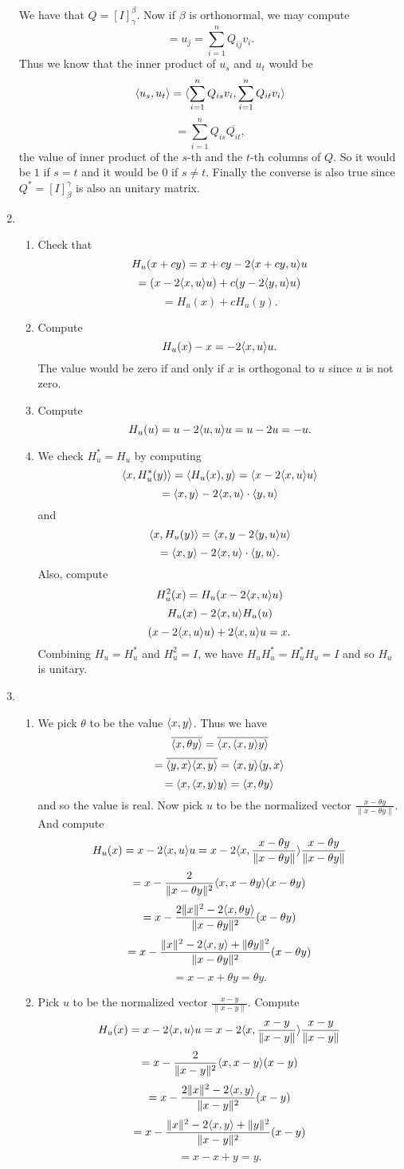 \begin{enumerate}
We have that $Q=[I]_{\gamma}^{\beta}$. Now if $\beta $ is orthonormal, we may compute 
\[=u_j=\sum_{i=1}^n{Q_{ij}v_i}.\]
Thus we know that the inner product of $u_s$ and $u_t$ would be 
\[\langle u_s,u_t\rangle =\langle \sum_{i=1}^n{Q_{is}v_i},\sum_{i=1}^n{Q_{it}v_i}\rangle \]
\[=\sum_{i=1}^n{Q_{is}\overline{Q_{it}}},\]
the value of inner product of the $s$-th and the $t$-th columns of $Q$. So it would be $1$ if $s=t$ and it would be $0$ if $s\neq t$. Finally the converse is also true since $Q^*=[I]_{\beta}^{\gamma}$ is also an unitary matrix.
\item \begin{enumerate}
\item Check that 
\[H_u(x+cy)=x+cy-2\langle x+cy,u\rangle u\]
\[=(x-2\langle x,u\rangle u)+c(y-2\langle y,u\rangle u)\]
\[=H_u(x)+cH_u(y).\]
\item Compute 
\[H_u(x)-x=-2\langle x,u\rangle u .\]
The value would be zero if and only if $x$ is orthogonal to $u$ since $u$ is not zero.
\item Compute 
\[H_u(u)=u-2\langle u,u\rangle u=u-2u=-u.\]
\item We check $H_u^*=H_u$ by computing 
\[\langle x,H_u^*(y)\rangle =\langle H_u(x),y\rangle =\langle x-2\langle x,u\rangle u\rangle \]
\[=\langle x,y\rangle -2\langle x,u\rangle \cdot \langle y,u\rangle \]
and 
\[\langle x,H_u(y)\rangle =\langle x,y-2\langle y,u\rangle u\rangle\]
\[=\langle x,y\rangle -2\langle x,u\rangle \cdot \langle y,u\rangle .\]
Also, compute
\[H_u^2(x)=H_u(x-2\langle x,u\rangle u)\]
\[H_u(x)-2\langle x,u\rangle H_u(u)\]
\[(x-2\langle x,u\rangle u)+2\langle x,u\rangle u=x.\]
Combining $H_u=H_u^*$ and $H_u^2=I$, we have $H_uH_u^*=H_u^*H_u=I$ and so $H_u$ is unitary.
\end{enumerate}
\item \begin{enumerate}
\item We pick $\theta $ to be the value $\langle x,y\rangle$. Thus we have 
\[\overline{\langle x,\theta y\rangle }=\overline{\langle x,\langle x,y\rangle y\rangle }\]
\[=\overline{\langle y,x\rangle\langle x,y\rangle }=\langle x,y\rangle \langle y,x\rangle \]
\[=\langle x,\langle x,y\rangle y\rangle =\langle x,\theta y\rangle \]
and so the value is real. Now pick $u$ to be the normalized vector $\frac{x-\theta y}{\|x-\theta y\|}$. And compute 
\[H_u(x)=x-2\langle x,u\rangle u=x-2\langle x,\frac{x-\theta y}{\|x-\theta y\|}\rangle \frac{x-\theta y}{\|x-\theta y\|}\]
\[=x-\frac{2}{\|x-\theta y\|^2}\langle x,x-\theta y\rangle (x-\theta y)\]
\[=x-\frac{2\|x\|^2-2\langle x,\theta y\rangle }{\|x-\theta y\|^2}(x-\theta y)\]
\[=x-\frac{\|x\|^2-2\langle x,y\rangle +\|\theta y\|^2}{\|x-\theta y\|^2}(x-\theta y)\]
\[=x-x+\theta y=\theta y.\]
\item Pick $u$ to be the normalized vector $\frac{x-y}{\|x-y\|}$. Compute 
\[H_u(x)=x-2\langle x,u\rangle u=x-2\langle x,\frac{x-y}{\|x-y\|}\rangle \frac{x-y}{\|x-y\|}\]
\[=x-\frac{2}{\|x-y\|^2}\langle x,x-y\rangle (x-y)\]
\[=x-\frac{2\|x\|^2-2\langle x,y\rangle }{\|x-y\|^2}(x-y)\]
\[=x-\frac{\|x\|^2-2\langle x,y\rangle +\|y\|^2}{\|x-y\|^2}(x-y)\]
\[=x-x+y=y.\]
\end{enumerate}
\end{enumerate}